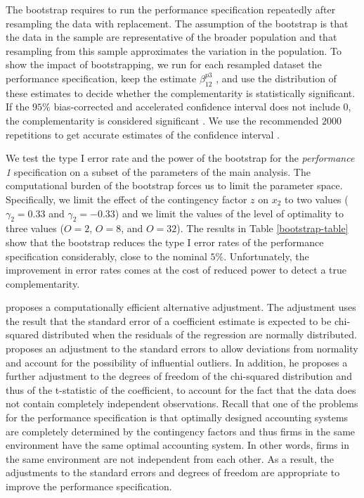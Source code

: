 \documentclass[12pt]{article}
\begin{document}
The bootstrap requires to run the performance specification repeatedly after resampling the data with replacement. The assumption of the bootstrap is that the data in the sample are representative of the broader population and that resampling from this sample approximates the variation in the population. To show the impact of bootstrapping, we run for each resampled dataset the performance specification, keep the estimate $\beta_{12}^{p3}$ , and use the distribution of these estimates to decide whether the complementarity is statistically significant. If the $95\%$ bias-corrected and accelerated confidence interval does not include $0$, the complementarity is considered significant \citep{efron_computer_2017}. We use the recommended $2000$ repetitions to get accurate estimates of the confidence interval \citep{efron_computer_2017}. 

We test the type I error rate and the power of the bootstrap for the \emph{performance 1} specification on a subset of the parameters of the main analysis. The computational burden of the bootstrap forces us to limit the parameter space. Specifically, we limit the effect of the contingency factor $z$ on $x_2$ to two values ($\gamma_2 = 0.33$ and $\gamma_2 = -0.33$) and we limit the values of the level of optimality to three values ($O=2$, $O=8$, and $O=32$). The results in Table \ref{bootstrap-table} show that the bootstrap reduces the type I error rates of the performance specification considerably, close to the nominal $5\%$.  Unfortunately, the improvement in error rates comes at the cost of reduced power to detect a true complementarity.



\citet{young_improved_2016} proposes a computationally efficient alternative adjustment. The adjustment uses the result that the standard error of a coefficient estimate is expected to be chi-squared distributed when the residuals of the regression are normally distributed. \cite{young_improved_2016} proposes an adjustment to the standard errors to allow deviations from normality and account for the possibility of influential outliers. In addition, he proposes a further adjustment to the degrees of freedom of the chi-squared distribution and thus of the t-statistic of the coefficient, to account for the fact that the data does not contain completely independent observations. Recall that one of the problems for the performance specification is that optimally designed accounting systems are completely determined by the contingency factors and thus firms in the same environment have the same optimal accounting system. In other words, firms in the same environment are not independent from each other. As a result, the adjustments to the standard errors and degrees of freedom are appropriate to improve the performance specification.
\end{document}

